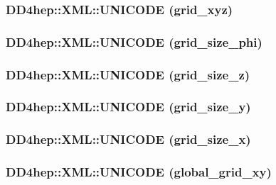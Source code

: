 \hypertarget{namespace_d_d4hep_1_1_x_m_l_a203e9791b2f513afbe5f25a2654256d1}{
\subsubsection[{UNICODE}]{\setlength{\rightskip}{0pt plus 5cm}DD4hep::XML::UNICODE (grid\_\-xyz)}}
\label{namespace_d_d4hep_1_1_x_m_l_a203e9791b2f513afbe5f25a2654256d1}
\hypertarget{namespace_d_d4hep_1_1_x_m_l_ab3272b02facd035f55618a408197f97e}{
\subsubsection[{UNICODE}]{\setlength{\rightskip}{0pt plus 5cm}DD4hep::XML::UNICODE (grid\_\-size\_\-phi)}}
\label{namespace_d_d4hep_1_1_x_m_l_ab3272b02facd035f55618a408197f97e}
\hypertarget{namespace_d_d4hep_1_1_x_m_l_a793789c9c6ec55782f2d1ee7d80422fb}{
\subsubsection[{UNICODE}]{\setlength{\rightskip}{0pt plus 5cm}DD4hep::XML::UNICODE (grid\_\-size\_\-z)}}
\label{namespace_d_d4hep_1_1_x_m_l_a793789c9c6ec55782f2d1ee7d80422fb}
\hypertarget{namespace_d_d4hep_1_1_x_m_l_a6d8f14edad61b6483f48a7db1400658b}{
\subsubsection[{UNICODE}]{\setlength{\rightskip}{0pt plus 5cm}DD4hep::XML::UNICODE (grid\_\-size\_\-y)}}
\label{namespace_d_d4hep_1_1_x_m_l_a6d8f14edad61b6483f48a7db1400658b}
\hypertarget{namespace_d_d4hep_1_1_x_m_l_a01c980ae57b695952e6fc7c8e4db18af}{
\subsubsection[{UNICODE}]{\setlength{\rightskip}{0pt plus 5cm}DD4hep::XML::UNICODE (grid\_\-size\_\-x)}}
\label{namespace_d_d4hep_1_1_x_m_l_a01c980ae57b695952e6fc7c8e4db18af}
\hypertarget{namespace_d_d4hep_1_1_x_m_l_af6d4ffc290b6e2dd3ef16118766f2fcf}{
\subsubsection[{UNICODE}]{\setlength{\rightskip}{0pt plus 5cm}DD4hep::XML::UNICODE (global\_\-grid\_\-xy)}}
